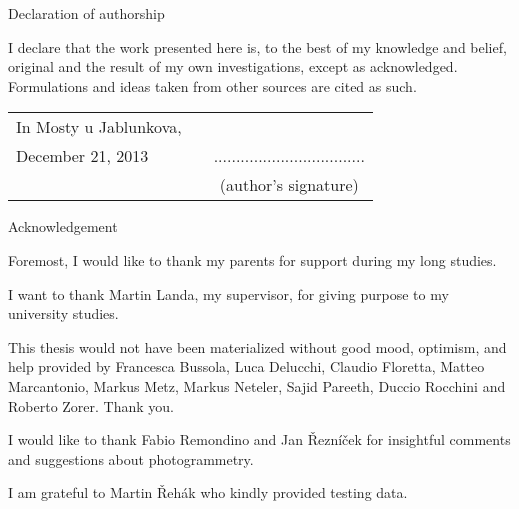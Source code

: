 \newcommand{\odsaditodzhora}{\hskip1pt\vfill}

\odsaditodzhora
\noindent Declaration of authorship

I declare that the work presented here is, to the best of my knowledge and
belief, original and the result of my own investigations, except as acknowledged.
Formulations and ideas taken from other sources are cited as such.

 \begin{flushleft}
\begin{tabular}{l m{6cm} c}
In Mosty u Jablunkova, && \\
December 21, 2013
& 
&
..................................
\\
&&
(author’s signature)
\end{tabular}

\end{flushleft}
\newpage


\odsaditodzhora
\noindent Acknowledgement

\noindent Foremost, I would like to thank my parents for support during my long studies. 

I want to thank Martin Landa, my supervisor, for giving purpose to my university studies. 

This thesis would not have  been materialized  without good mood, optimism, and help provided by
 Francesca Bussola,  Luca Delucchi, Claudio Floretta, Matteo Marcantonio, Markus Metz,
 Markus Neteler, Sajid Pareeth, Duccio Rocchini and Roberto Zorer. Thank you.
  
I would like to thank Fabio Remondino and Jan Řezníček for insightful comments and suggestions about photogrammetry. 
 
\noindent I am grateful to Martin Řehák who kindly provided testing data. 


\newpage
